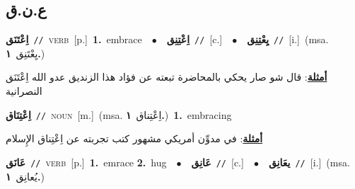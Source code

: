 \documentclass[10pt,a4paper,twoside]{article} %
\begin{document}
\begin{multicols}{2}
\vspace{-3mm}
\subsection*{\color{blue}\foreignlanguage{arabic}{ع.ن.ق}\color{blue}{}} 

{\setlength\topsep{0pt}\textbf{\foreignlanguage{arabic}{اِعْتَنَق}}\ {\color{gray}\texttt{//}\color{black}}\ \textsc{verb}\ [p.]\ \textbf{1.}~embrace\ \ $\bullet$\ \ \setlength\topsep{0pt}\textbf{\foreignlanguage{arabic}{اِعْتِنِق}}\ {\color{gray}\texttt{//}\color{black}}\ [c.]\ \ $\bullet$\ \ \setlength\topsep{0pt}\textbf{\foreignlanguage{arabic}{يِعْتِنِق}}\ {\color{gray}\texttt{//}\color{black}}\ [i.]\ \color{gray}(msa. \foreignlanguage{arabic}{يِعْتَنِق}~\foreignlanguage{arabic}{\textbf{١.}})\color{black}\  \begin{flushright}\color{gray}\foreignlanguage{arabic}{\textbf{\underline{\foreignlanguage{arabic}{أمثلة}}}: قال شو صار يحكي بالمحاضرة تبعته عن فؤاد هذا الزنديق عدو الله اِعْتَنَق النصرانية}\end{flushright}\color{black}} \vspace{2mm}

{\setlength\topsep{0pt}\textbf{\foreignlanguage{arabic}{اِعْتِنَاق}}\ {\color{gray}\texttt{//}\color{black}}\ \textsc{noun}\ [m.]\ \color{gray}(msa. \foreignlanguage{arabic}{اِعْتِناق}~\foreignlanguage{arabic}{\textbf{١.}})\color{black}\ \textbf{1.}~embracing\  \begin{flushright}\color{gray}\foreignlanguage{arabic}{\textbf{\underline{\foreignlanguage{arabic}{أمثلة}}}: في مدوِّن أمريكي مشهور كتب تجربته عن اِعْتِناق الإِسلام}\end{flushright}\color{black}} \vspace{2mm}

{\setlength\topsep{0pt}\textbf{\foreignlanguage{arabic}{عَانَق}}\ {\color{gray}\texttt{//}\color{black}}\ \textsc{verb}\ [p.]\ \textbf{1.}~emrace  \textbf{2.}~hug\ \ $\bullet$\ \ \setlength\topsep{0pt}\textbf{\foreignlanguage{arabic}{عَانِق}}\ {\color{gray}\texttt{//}\color{black}}\ [c.]\ \ $\bullet$\ \ \setlength\topsep{0pt}\textbf{\foreignlanguage{arabic}{يعَانِق}}\ {\color{gray}\texttt{//}\color{black}}\ [i.]\ \color{gray}(msa. \foreignlanguage{arabic}{يُعانِق}~\foreignlanguage{arabic}{\textbf{١.}})\color{black}\ } \vspace{2mm}


\end{multicols}
\end{document}
